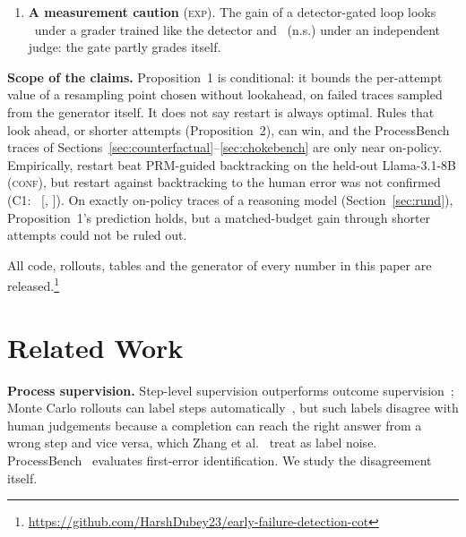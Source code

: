 \documentclass[10pt,twocolumn]{article}
\begin{document}
\begin{enumerate}
(H1), at \costDra$\times$ the base cost (claim repair \costRep$\times$, the choke-point-aware controller CARE \costCare$\times$,
Chain-of-Verification \costCove$\times$). We prove that DRA's residual hallucination rate is the
detector's $P(\text{hallucinated}\mid\text{pass})$ whatever the retry budget, which predicts
\lawH\% $\to$ \lawPi\% [\lawPiLo, \lawPiHi] with human labels, and gives an operating curve down to
\ocUnionPi\% at \ocUnionDraws\ generations per answer; a four-fold retry budget raises coverage by
\invCov\ points while delivered hallucination stays within \invEOne\ points, as predicted (\textsc{exp}).
\item \textbf{A measurement caution} (\textsc{exp}). The gain of a detector-gated loop looks
\robBaseETwoDiff\ under a grader trained like the detector and \robBaseEOneDiff\ (n.s.) under an
independent judge: the gate partly grades itself.
\end{enumerate}
\textbf{Scope of the claims.} Proposition~1 is conditional: it bounds the per-attempt value of a
resampling point chosen without lookahead, on failed traces sampled from the generator itself. It
does not say restart is always optimal. Rules that look ahead, or shorter attempts
(Proposition~2), can win, and the ProcessBench traces of Sections~\ref{sec:counterfactual}--\ref{sec:chokebench}
are only near on-policy. Empirically, restart beat PRM-guided backtracking on the held-out
Llama-3.1-8B (\textsc{conf}), but restart against backtracking to the human error was not confirmed
(C1: \LlamaBtRestErr\ [\LlamaBtRestErrLo, \LlamaBtRestErrHi]). On exactly on-policy traces of a reasoning model (Section~\ref{sec:rund}), Proposition~1's
prediction holds, but a matched-budget gain through shorter attempts could not be ruled out.

All code, rollouts, tables and the generator of every number in this paper are
released.\footnote{\url{https://github.com/HarshDubey23/early-failure-detection-cot}}

\section{Related Work}
\textbf{Process supervision.} Step-level supervision outperforms outcome supervision~\cite{lightman2023,uesato2022};
Monte Carlo rollouts can label steps automatically~\cite{wang2024shepherd}, but such labels disagree with human
judgements because a completion can reach the right answer from a wrong step and vice versa, which
Zhang et al.~\cite{zhang2025lessons} treat as label noise. ProcessBench~\cite{processbench} evaluates
first-error identification. We study the disagreement itself.
\end{document}

